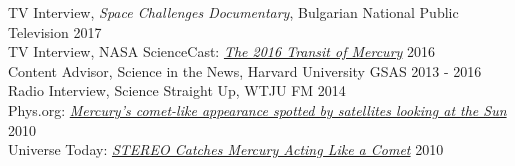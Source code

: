 \documentclass[12pt]{report}
\begin{document}
\noindent TV Interview, {\it Space Challenges Documentary}, Bulgarian National Public Television \hfill 2017\\
\noindent TV Interview, NASA ScienceCast: \href{https://www.youtube.com/watch?v=Gibaxh9x7O0&ab_channel=ScienceAtNASA}{{\it The 2016 Transit of Mercury}} \hfill 2016\\
\noindent Content Advisor, Science in the News, Harvard University GSAS \hfill 2013 - 2016\\
\noindent Radio Interview, Science Straight Up, WTJU FM \hfill 2014\\
\noindent Phys.org: \href{https://phys.org/news/2010-09-mercury-comet-like-satellites-sun.html}{{\it Mercury's comet-like appearance spotted by satellites looking at the Sun}} \hfill 2010\\
\noindent Universe Today: \href{https://www.universetoday.com/74279/stereo-catches-mercury-acting-like-a-comet/}{{\it STEREO Catches Mercury Acting Like a Comet}} \hfill 2010\\
\end{document}
